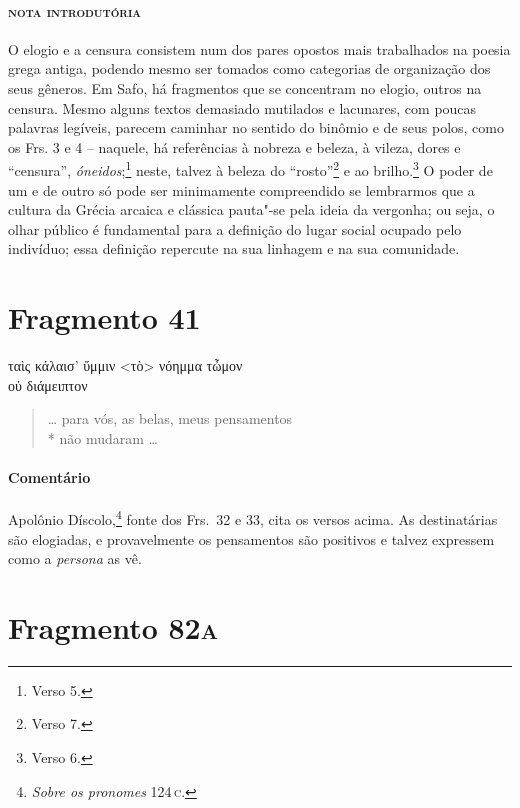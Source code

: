 \paragraph{\textsc{nota introdutória}}
O elogio e a censura consistem num dos pares opostos mais trabalhados na poesia
grega antiga, podendo mesmo ser tomados como categorias de organização dos seus gêneros.
Em Safo, há fragmentos que se concentram no
elogio, outros na
censura. Mesmo alguns textos demasiado mutilados e lacunares, com poucas palavras legíveis, parecem caminhar no sentido do binômio e de seus polos, como os Frs. 3 e 4 -- naquele, há referências à nobreza e beleza, à vileza, dores e ``censura'', \textit{óneidos};\footnote{Verso 5.} neste, talvez à beleza do ``rosto''\footnote{Verso 7.} e ao brilho.\footnote{Verso 6.} O poder de um e de outro só pode ser
minimamente compreendido se lembrarmos que a cultura da Grécia arcaica e
clássica pauta"-se pela ideia da vergonha; ou seja, o olhar público é
fundamental para a definição do lugar social ocupado pelo indivíduo; essa
definição repercute na sua linhagem e na sua comunidade. 

\section{Fragmento 41}

\begin{gkverse}
ταὶς κάλαισ’ ὔμμιν <τὸ> νόημμα τὦμον\\
       οὐ διάμειπτον
\end{gkverse}

\begin{verse}
\ldots{} para vós, as belas, meus pensamentos\\*
não mudaram \ldots{}
\end{verse}

\medskip

{\paragraph{Comentário} Apolônio Díscolo,\footnote{\textit{Sobre os pronomes} 124\,\textsc{c}.} fonte dos Frs.~32 e 33, cita os versos acima.
As destinatárias são elogiadas, e provavelmente os pensamentos são positivos e talvez expressem como a \textit{persona} as vê.}


\pagebreak
\section{Fragmento 82\textsc{a}}

